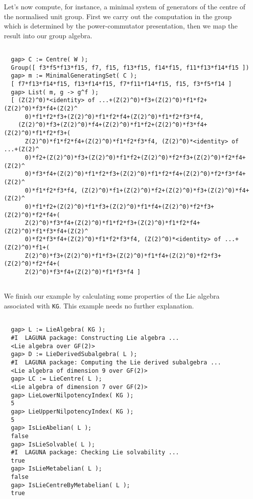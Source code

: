 \documentclass[a4paper,11pt]{report}
\begin{document}
{\begin{Verbatim}[fontsize=\small,frame=single,label=Example]
\end{Verbatim}
 \newpage Let's now compute, for instance, a minimal system of generators of the centre
of the normalised unit group. First we carry out the computation in the group
which is determined by the power-commutator presentation, then we map the
result into our group algebra. 
\begin{Verbatim}[fontsize=\small,frame=single,label=Example]
  
  gap> C := Centre( W );
  Group([ f3*f5*f13*f15, f7, f15, f13*f15, f14*f15, f11*f13*f14*f15 ])
  gap> m := MinimalGeneratingSet( C );
  [ f7*f13*f14*f15, f13*f14*f15, f7*f11*f14*f15, f15, f3*f5*f14 ]
  gap> List( m, g -> g^f );
  [ (Z(2)^0)*<identity> of ...+(Z(2)^0)*f3+(Z(2)^0)*f1*f2+(Z(2)^0)*f3*f4+(Z(2)^
      0)*f1*f2*f3+(Z(2)^0)*f1*f2*f4+(Z(2)^0)*f1*f2*f3*f4,
    (Z(2)^0)*f3+(Z(2)^0)*f4+(Z(2)^0)*f1*f2+(Z(2)^0)*f3*f4+(Z(2)^0)*f1*f2*f3+(
      Z(2)^0)*f1*f2*f4+(Z(2)^0)*f1*f2*f3*f4, (Z(2)^0)*<identity> of ...+(Z(2)^
      0)*f2+(Z(2)^0)*f3+(Z(2)^0)*f1*f2+(Z(2)^0)*f2*f3+(Z(2)^0)*f2*f4+(Z(2)^
      0)*f3*f4+(Z(2)^0)*f1*f2*f3+(Z(2)^0)*f1*f2*f4+(Z(2)^0)*f2*f3*f4+(Z(2)^
      0)*f1*f2*f3*f4, (Z(2)^0)*f1+(Z(2)^0)*f2+(Z(2)^0)*f3+(Z(2)^0)*f4+(Z(2)^
      0)*f1*f2+(Z(2)^0)*f1*f3+(Z(2)^0)*f1*f4+(Z(2)^0)*f2*f3+(Z(2)^0)*f2*f4+(
      Z(2)^0)*f3*f4+(Z(2)^0)*f1*f2*f3+(Z(2)^0)*f1*f2*f4+(Z(2)^0)*f1*f3*f4+(Z(2)^
      0)*f2*f3*f4+(Z(2)^0)*f1*f2*f3*f4, (Z(2)^0)*<identity> of ...+(Z(2)^0)*f1+(
      Z(2)^0)*f3+(Z(2)^0)*f1*f3+(Z(2)^0)*f1*f4+(Z(2)^0)*f2*f3+(Z(2)^0)*f2*f4+(
      Z(2)^0)*f3*f4+(Z(2)^0)*f1*f3*f4 ]
  
\end{Verbatim}
 We finish our example by calculating some properties of the Lie algebra
associated with \texttt{KG}. This example needs no further explanation. 
\begin{Verbatim}[fontsize=\small,frame=single,label=Example]
  
  gap> L := LieAlgebra( KG );
  #I  LAGUNA package: Constructing Lie algebra ...
  <Lie algebra over GF(2)>
  gap> D := LieDerivedSubalgebra( L );
  #I  LAGUNA package: Computing the Lie derived subalgebra ...
  <Lie algebra of dimension 9 over GF(2)>
  gap> LC := LieCentre( L );
  <Lie algebra of dimension 7 over GF(2)>
  gap> LieLowerNilpotencyIndex( KG );
  5
  gap> LieUpperNilpotencyIndex( KG );
  5
  gap> IsLieAbelian( L );
  false
  gap> IsLieSolvable( L );
  #I  LAGUNA package: Checking Lie solvability ...
  true
  gap> IsLieMetabelian( L );
  false
  gap> IsLieCentreByMetabelian( L );
  true
  
\end{Verbatim}
 }
\end{document}

